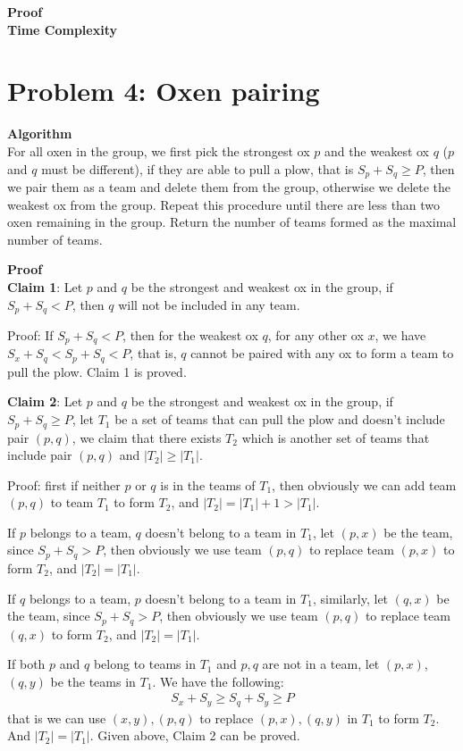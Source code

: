 \documentclass{article}
\newcommand{\Complexity}{\vspace{0.3cm} \noindent\textbf{Time Complexity} \\}
\newcommand{\Proof}{\vspace{0.3cm} \noindent\textbf{Proof} \\}
\newcommand{\Algorithm}{\textbf{Algorithm} \\}
\begin{document}
\Proof

\Complexity

\section*{Problem 4: Oxen pairing}
\Algorithm
For all oxen in the group, we first pick the strongest ox $p$ and the weakest ox $q$ ($p$ and $q$
must be different), if they 
are able to pull a plow, that is $S_p + S_q \geq P$, then we pair them as a team and delete them
from the group, otherwise we delete the weakest ox from the group. Repeat this procedure until there 
are less than two oxen remaining in the group. Return the number of teams formed as the maximal
number of teams.

\Proof
\textbf{Claim 1}: 
Let $p$ and $q$ be the strongest and weakest ox in the group, if $S_p + S_q < P$,
then $q$ will not be included in any team.

Proof: If $S_p + S_q < P$, then for the weakest ox $q$, for any other ox $x$, we have $S_x + S_q <
S_p + S_q < P$, that is, $q$ cannot be paired with any ox to form a team to pull the plow. Claim 1
is proved.

\vspace{0.3cm}
\textbf{Claim 2}: 
Let $p$ and $q$ be the strongest and weakest ox in the group, if $S_p + S_q \geq P$, let $T_1$ be a
set of teams that can pull the plow and doesn't include pair $(p, q)$, we claim that there exists
$T_2$ which is another set of teams that include pair $(p, q)$ and $|T_2| \geq |T_1|$.

Proof: first if neither $p$ or $q$ is in the teams of $T_1$, then obviously we can add team $(p,
q)$ to team $T_1$ to form $T_2$, and $|T_2| = |T_1| + 1 > |T_1|$.

If $p$ belongs to a team, $q$ doesn't belong to a team in $T_1$, let $(p, x)$ be the team, since 
$S_p + S_q > P$, then obviously we use team $(p, q)$ to replace team $(p, x)$ to form $T_2$, and 
$|T_2| = |T_1|$.


If $q$ belongs to a team, $p$ doesn't belong to a team in $T_1$, similarly, let $(q, x)$ be the team, since 
$S_p + S_q > P$, then obviously we use team $(p, q)$ to replace team $(q, x)$ to form $T_2$, and 
$|T_2| = |T_1|$.

If both $p$ and $q$ belong to teams in $T_1$ and $p, q$ are not in a team, let $(p, x)$, $(q, y)$ be
the teams in $T_1$. We have the following:
\begin{align}
  S_x + S_y \geq S_q + S_y \geq P 
\end{align}
that is we can use $(x, y), (p, q)$ to replace $(p, x), (q, y)$ in $T_1$ to form $T_2$. And $|T_2| =
|T_1|$.
Given above, Claim 2 can be proved.
\end{document}
